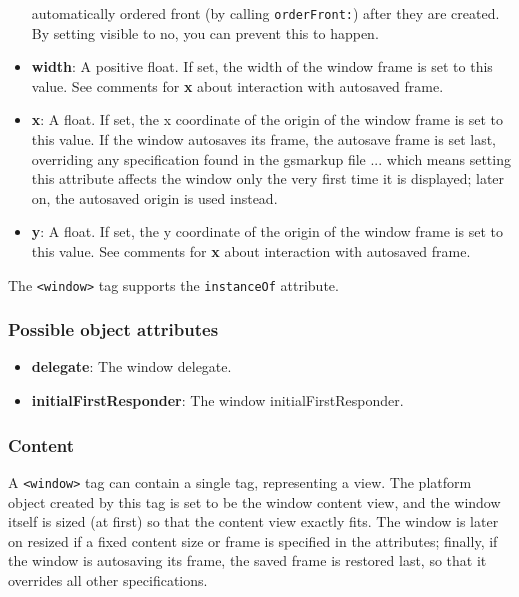 \begin{itemize}
  automatically ordered front (by calling \texttt{orderFront:}) after
  they are created.  By setting visible to no, you can prevent this to
  happen.
\item {\bf width}: A positive float.  If set, the width of the window
  frame is set to this value.  See comments for {\bf x} about
  interaction with autosaved frame.
\item {\bf x}: A float.  If set, the x coordinate of the origin of the
  window frame is set to this value.  If the window autosaves its
  frame, the autosave frame is set last, overriding any specification
  found in the gsmarkup file ... which means setting this attribute
  affects the window only the very first time it is displayed; later
  on, the autosaved origin is used instead.
\item {\bf y}: A float.  If set, the y coordinate of the origin of the
  window frame is set to this value.  See comments for {\bf x} about
  interaction with autosaved frame.
\end{itemize}

The \texttt{<window>} tag supports the \texttt{instanceOf} attribute.

\subsubsection{Possible object attributes}
\begin{itemize}
\item {\bf delegate}: The window delegate.
\item {\bf initialFirstResponder}: The window initialFirstResponder.
\end{itemize}

\subsubsection{Content}
A \texttt{<window>} tag can contain a single tag, representing a view.
The platform object created by this tag is set to be the window
content view, and the window itself is sized (at first) so that the
content view exactly fits.  The window is later on resized if a fixed
content size or frame is specified in the attributes; finally, if the
window is autosaving its frame, the saved frame is restored last, so
that it overrides all other specifications.

